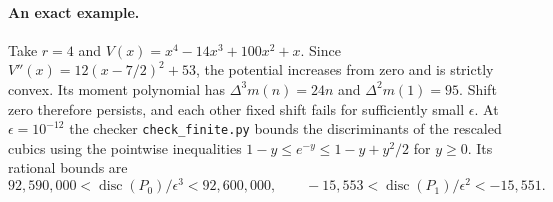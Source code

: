 \paragraph{An exact example.}
Take $r=4$ and $V(x)=x^4-14x^3+100x^2+x$. Since
$V''(x)=12(x-7/2)^2+53$, the potential increases from zero and is strictly
convex. Its moment polynomial has $\Delta^3m(n)=24n$ and
$\Delta^2m(1)=95$. Shift zero therefore persists, and each other fixed
shift fails for sufficiently small $\epsilon$. At $\epsilon=10^{-12}$
the checker \texttt{check\_finite.py} bounds the discriminants of the
rescaled cubics using the pointwise inequalities
$1-y\le e^{-y}\le1-y+y^2/2$ for $y\ge0$. Its rational bounds are
\[
 92{,}590{,}000<\operatorname{disc}(P_0)/\epsilon^3<92{,}600{,}000,
 \qquad
 -15{,}553<\operatorname{disc}(P_1)/\epsilon^2<-15{,}551 .
\]
